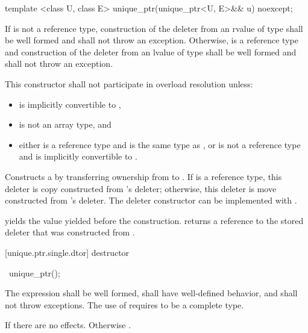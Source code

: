 %
\begin{itemdecl}
template <class U, class E> unique_ptr(unique_ptr<U, E>&& u) noexcept;
\end{itemdecl}

\begin{itemdescr}
\pnum
\requires If  is not a reference type,
construction of the deleter from an rvalue of type
 shall be well formed and shall not throw an exception.
Otherwise,  is a reference type and construction of the deleter from an
lvalue of type  shall be well formed and shall not throw an exception.

\pnum
\remarks This constructor shall not participate in overload resolution unless:

\begin{itemize}
\item {} is implicitly convertible to ,
\item {} is not an array type, and
\item either  is a reference type and  is the same type as , or
 is not a reference type and  is implicitly convertible to .
\end{itemize}

\pnum
\effects Constructs a  by transferring ownership from 
to . If  is a reference type, this deleter is copy constructed from
's deleter; otherwise, this deleter is move constructed from 's
deleter. \enternote The deleter constructor can be implemented with
. \exitnote

\pnum
\postconditions {} yields the value 
yielded before the construction.
 returns a reference
to the stored deleter that was constructed from
.
\end{itemdescr}

[unique.ptr.single.dtor]{ destructor}

\begin{itemdecl}
~unique_ptr();
\end{itemdecl}

\begin{itemdescr}
\pnum
\requires The expression  shall be well formed,
shall have well-defined behavior, and shall not throw exceptions. \enternote The
use of  requires  to be a complete type.
\exitnote

\pnum
\effects If  there are no effects.
Otherwise .
\end{itemdescr}


